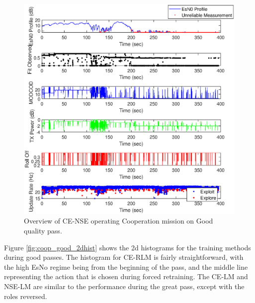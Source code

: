 \begin{figure}[ht]
\centering
\includegraphics[width=\textwidth]{figures/flight_results/coop_good_nse_overview.eps}
\caption{Overview of CE-NSE operating Cooperation mission on Good quality pass.}
\label{fig:flight_nse_coop_good_overview}
\end{figure}

\par Figure \ref{fig:coop_good_2dhist} shows the 2d histograms for the training methods during good passes. The histogram for CE-RLM is fairly straightforward, with the high EsNo regime being from the beginning of the pass, and the middle line representing the action that is chosen during forced retraining. The CE-LM and NSE-LM are similar to the performance during the great pass, except with the roles reversed. 

